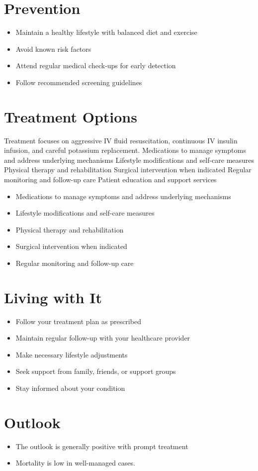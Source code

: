 \section{Prevention}
\begin{itemize}[noitemsep]
  \item Maintain a healthy lifestyle with balanced diet and exercise
  \item Avoid known risk factors
  \item Attend regular medical check-ups for early detection
  \item Follow recommended screening guidelines
\end{itemize}
\section{Treatment Options}
Treatment focuses on aggressive IV fluid resuscitation, continuous IV insulin infusion, and careful potassium replacement. Medications to manage symptoms and address underlying mechanisms Lifestyle modifications and self-care measures Physical therapy and rehabilitation Surgical intervention when indicated Regular monitoring and follow-up care Patient education and support services

\begin{itemize}[noitemsep]
  \item Medications to manage symptoms and address underlying mechanisms
  \item Lifestyle modifications and self-care measures
  \item Physical therapy and rehabilitation
  \item Surgical intervention when indicated
  \item Regular monitoring and follow-up care
\end{itemize}
\section{Living with It}
\begin{itemize}[noitemsep]
  \item Follow your treatment plan as prescribed
  \item Maintain regular follow-up with your healthcare provider
  \item Make necessary lifestyle adjustments
  \item Seek support from family, friends, or support groups
  \item Stay informed about your condition
\end{itemize}
\section{Outlook}
\begin{itemize}[noitemsep]
  \item The outlook is generally positive with prompt treatment
  \item Mortality is low in well-managed cases.
\end{itemize}
